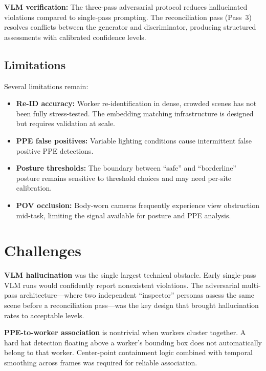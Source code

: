 \documentclass[11pt, twocolumn]{article}
\begin{document}
\textbf{VLM verification:} The three-pass adversarial protocol reduces hallucinated violations compared to single-pass prompting. The reconciliation pass (Pass~3) resolves conflicts between the generator and discriminator, producing structured assessments with calibrated confidence levels.

\subsection{Limitations}

Several limitations remain:

\begin{itemize}[nosep, leftmargin=*]
    \item \textbf{Re-ID accuracy:} Worker re-identification in dense, crowded scenes has not been fully stress-tested. The embedding matching infrastructure is designed but requires validation at scale.
    \item \textbf{PPE false positives:} Variable lighting conditions cause intermittent false positive PPE detections.
    \item \textbf{Posture thresholds:} The boundary between ``safe'' and ``borderline'' posture remains sensitive to threshold choices and may need per-site calibration.
    \item \textbf{POV occlusion:} Body-worn cameras frequently experience view obstruction mid-task, limiting the signal available for posture and PPE analysis.
\end{itemize}

\section{Challenges}

\textbf{VLM hallucination} was the single largest technical obstacle. Early single-pass VLM runs would confidently report nonexistent violations. The adversarial multi-pass architecture---where two independent ``inspector'' personas assess the same scene before a reconciliation pass---was the key design that brought hallucination rates to acceptable levels.

\textbf{PPE-to-worker association} is nontrivial when workers cluster together. A hard hat detection floating above a worker's bounding box does not automatically belong to that worker. Center-point containment logic combined with temporal smoothing across frames was required for reliable association.
\end{document}
